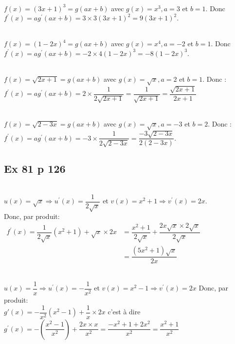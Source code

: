 \documentclass[12pt,a5paper]{book}
\begin{document}
\begin{enumMet}
    \item {}\\
    $f(x)=(3 x+1)^{3}=g(a x+b)$ avec $g(x)=x^{3}, a=3$ et $b=1 .$ Donc\\
    $f^{\prime}(x)=a g^{\prime}(a x+b)=3 \times 3(3 x+1)^{2}=9(3 x+1)^{2}$.
    \item {}\\
    $f(x)=(1-2 x)^{4}=g(a x+b)$ avec $g(x)=x^{4}, a=-2$ et $b=1$. Donc\\
    $f^{\prime}(x)=a g^{\prime}(a x+b)=-2 \times 4(1-2 x)^{3}=-8(1-2 x)^{3}$.
    \item {}\\
    $f(x)=\sqrt{2 x+1}=g(a x+b)$ avec $g(x)=\sqrt{x}, a=2$ et $b=1 .$ Donc : \\
    $f^{\prime}(x)=a g^{\prime}(a x+b)=2 \times \dfrac{1}{2 \sqrt{2 x+1}}=\dfrac{1}{\sqrt{2 x+1}}=\dfrac{\sqrt{2 x+1}}{2 x+1}$
    \item {}\\
    $f(x)=\sqrt{2-3 x}=g(a x+b)$ avec $g(x)=\sqrt{x}, a=-3$ et $b=2$. Donc : \\
    $f^{\prime}(x)=a g^{\prime}(a x+b)=-3 \times \dfrac{1}{2 \sqrt{2-3 x}}=\dfrac{-3 \sqrt{2-3 x}}{2(2-3 x)}$.
\end{enumMet}

\subsection*{Ex 81 p 126}
\begin{enumMet}
    \item {}\\
    $u(x)=\sqrt{x} \Rightarrow u^{\prime}(x)=\dfrac{1}{2 \sqrt{x}}$ et $v(x)=x^{2}+1 \Rightarrow v^{\prime}(x)=2 x$.\\
    Donc, par produit:\\
$\begin{aligned} f^{\prime}(x)=\dfrac{1}{2 \sqrt{x}}\left(x^{2}+1\right)+\sqrt{x} \times 2 x &=\dfrac{x^{2}+1}{2 \sqrt{x}}+\dfrac{2 x \sqrt{x} \times 2 \sqrt{x}}{2 \sqrt{x}} \\ &=\dfrac{\left(5 x^{2}+1\right) \sqrt{x}}{2 x} \end{aligned}$
    \item {}\\
    $u(x)=\dfrac{1}{x} \Rightarrow u^{\prime}(x)=-\dfrac{1}{x^{2}}$ et $v(x)=x^{2}-1 \Rightarrow v^{\prime}(x)=2 x$
Donc, par produit:\\
$g'(x)=-\dfrac{1}{x^{2}}\left(x^{2}-1\right)+\dfrac{1}{x} \times 2 x$ c'est à dire\\
$g^{\prime}(x)=-\left(\dfrac{x^{2}-1}{x^{2}}\right)+\dfrac{2 x \times x}{x^{2}}=\dfrac{-x^{2}+1+2 x^{2}}{x^{2}}=\dfrac{x^{2}+1}{x^{2}}$
\end{enumMet}
\end{document}
